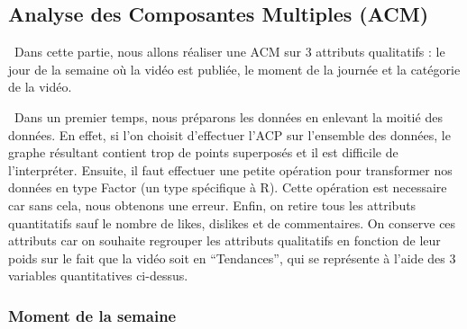 \documentclass[
]{article}
\newenvironment{Shaded}{\begin{snugshade}}{\end{snugshade}}
\newcommand{\ControlFlowTok}[1]{\textcolor[rgb]{0.13,0.29,0.53}{\textbf{#1}}}
\newcommand{\DecValTok}[1]{\textcolor[rgb]{0.00,0.00,0.81}{#1}}
\newcommand{\KeywordTok}[1]{\textcolor[rgb]{0.13,0.29,0.53}{\textbf{#1}}}
\newcommand{\NormalTok}[1]{#1}
\newcommand{\OperatorTok}[1]{\textcolor[rgb]{0.81,0.36,0.00}{\textbf{#1}}}
\newcommand{\OtherTok}[1]{\textcolor[rgb]{0.56,0.35,0.01}{#1}}
\newcommand{\StringTok}[1]{\textcolor[rgb]{0.31,0.60,0.02}{#1}}
\begin{document}
\hypertarget{analyse-des-composantes-multiples-acm}{%
\subsection{Analyse des Composantes Multiples
(ACM)}\label{analyse-des-composantes-multiples-acm}}

 Dans cette partie, nous allons réaliser une ACM sur 3 attributs
qualitatifs : le jour de la semaine où la vidéo est publiée, le moment
de la journée et la catégorie de la vidéo.

 Dans un premier temps, nous préparons les données en enlevant la moitié
des données. En effet, si l'on choisit d'effectuer l'ACP sur l'ensemble
des données, le graphe résultant contient trop de points superposés et
il est difficile de l'interpréter. Ensuite, il faut effectuer une petite
opération pour transformer nos données en type Factor (un type
spécifique à R). Cette opération est necessaire car sans cela, nous
obtenons une erreur. Enfin, on retire tous les attributs quantitatifs
sauf le nombre de likes, dislikes et de commentaires. On conserve ces
attributs car on souhaite regrouper les attributs qualitatifs en
fonction de leur poids sur le fait que la vidéo soit en ``Tendances'',
qui se représente à l'aide des 3 variables quantitatives ci-dessus.

\begin{Shaded}
\end{Shaded}

\hypertarget{moment-de-la-semaine}{%
\subsubsection{Moment de la semaine}\label{moment-de-la-semaine}}
\end{document}
